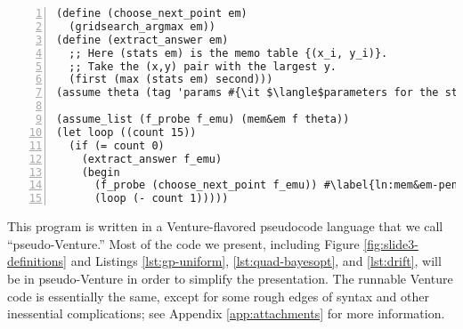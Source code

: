 \begin{lstlisting}[frame=single,escapechar=\#,numbers=left,numbersep=5pt,numberstyle=\tiny\color{gray}]
(define (choose_next_point em)
  (gridsearch_argmax em))
(define (extract_answer em)
  ;; Here (stats em) is the memo table {(x_i, y_i)}.
  ;; Take the (x,y) pair with the largest y.
  (first (max (stats em) second)))
(assume theta (tag 'params #{\it $\langle$parameters for the statistical emulator$\rangle$}#))

(assume_list (f_probe f_emu) (mem&em f theta))
(let loop ((count 15))
  (if (= count 0)
    (extract_answer f_emu)
    (begin
      (f_probe (choose_next_point f_emu)) #\label{ln:mem&em-penultimate}#
      (loop (- count 1)))))
\end{lstlisting}
This program is written in a Venture-flavored pseudocode language that we call
``pseudo-Venture.''  Most of the code we present, including Figure
\ref{fig:slide3-definitions} and Listings \ref{lst:gp-uniform},
\ref{lst:quad-bayesopt}, and \ref{lst:drift}, will be in pseudo-Venture in order
to simplify the presentation.  The runnable Venture code is essentially the
same, except for some rough edges of syntax and other inessential complications;
see Appendix \ref{app:attachments} for more information.

